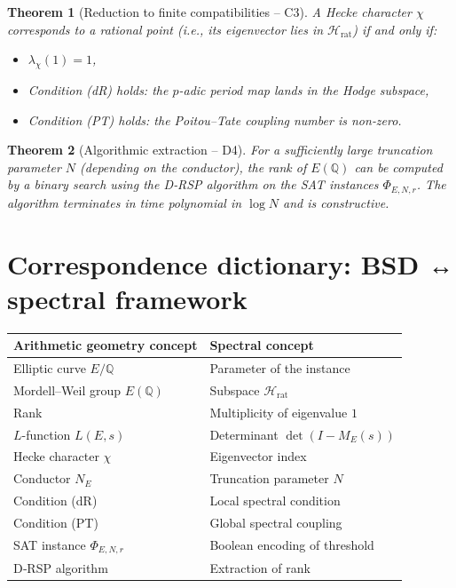 \documentclass[11pt,a4paper]{article}
\newtheorem{theorem}{Theorem}[section]
\begin{document}
\begin{theorem}[Reduction to finite compatibilities – C3]
A Hecke character \(\chi\) corresponds to a rational point (i.e., its eigenvector lies in \(\mathcal{H}_{\text{rat}}\)) if and only if:
\begin{itemize}
\item \(\lambda_\chi(1)=1\),
\item Condition (dR) holds: the \(p\)-adic period map lands in the Hodge subspace,
\item Condition (PT) holds: the Poitou–Tate coupling number is non‑zero.
\end{itemize}
\end{theorem}

\begin{theorem}[Algorithmic extraction – D4]
For a sufficiently large truncation parameter \(N\) (depending on the conductor), the rank of \(E(\mathbb{Q})\) can be computed by a binary search using the D‑RSP algorithm on the SAT instances \(\Phi_{E,N,r}\). The algorithm terminates in time polynomial in \(\log N\) and is constructive.
\end{theorem}

\section{Correspondence dictionary: BSD ↔ spectral framework}

\begin{center}
\small
\begin{tabular}{@{}l|l@{}}
\toprule
\textbf{Arithmetic geometry concept} & \textbf{Spectral concept} \\
\midrule
Elliptic curve \(E/\mathbb{Q}\) & Parameter of the instance \\
Mordell–Weil group \(E(\mathbb{Q})\) & Subspace \(\mathcal{H}_{\text{rat}}\) \\
Rank & Multiplicity of eigenvalue \(1\) \\
\(L\)-function \(L(E,s)\) & Determinant \(\det(I - M_E(s))\) \\
Hecke character \(\chi\) & Eigenvector index \\
Conductor \(N_E\) & Truncation parameter \(N\) \\
Condition (dR) & Local spectral condition \\
Condition (PT) & Global spectral coupling \\
SAT instance \(\Phi_{E,N,r}\) & Boolean encoding of threshold \\
D‑RSP algorithm & Extraction of rank \\
\bottomrule
\end{tabular}
\end{center}
\end{document}
